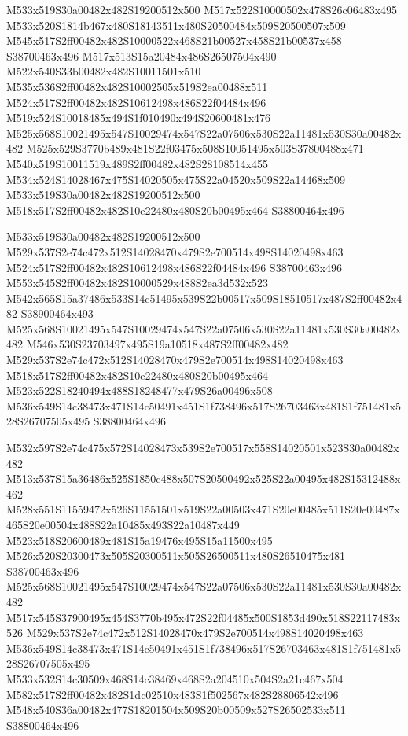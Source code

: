 \documentclass{article}
\begin{document}
\begin{multicols}{2}
M533x519S30a00482x482S19200512x500 M517x522S10000502x478S26c06483x495 M533x520S1814b467x480S18143511x480S20500484x509S20500507x509 M545x517S2ff00482x482S10000522x468S21b00527x458S21b00537x458 S38700463x496 M517x513S15a20484x486S26507504x490 M522x540S33b00482x482S10011501x510 M535x536S2ff00482x482S10002505x519S2ea00488x511 M524x517S2ff00482x482S10612498x486S22f04484x496 M519x524S10018485x494S1f010490x494S20600481x476 M525x568S10021495x547S10029474x547S22a07506x530S22a11481x530S30a00482x482 M525x529S3770b489x481S22f03475x508S10051495x503S37800488x471 M540x519S10011519x489S2ff00482x482S28108514x455 M534x524S14028467x475S14020505x475S22a04520x509S22a14468x509 M533x519S30a00482x482S19200512x500 M518x517S2ff00482x482S10e22480x480S20b00495x464 S38800464x496

M533x519S30a00482x482S19200512x500 M529x537S2e74c472x512S14028470x479S2e700514x498S14020498x463 M524x517S2ff00482x482S10612498x486S22f04484x496 S38700463x496 M553x545S2ff00482x482S10000529x488S2ea3d532x523 M542x565S15a37486x533S14c51495x539S22b00517x509S18510517x487S2ff00482x482 S38900464x493 M525x568S10021495x547S10029474x547S22a07506x530S22a11481x530S30a00482x482 M546x530S23703497x495S19a10518x487S2ff00482x482 M529x537S2e74c472x512S14028470x479S2e700514x498S14020498x463 M518x517S2ff00482x482S10e22480x480S20b00495x464 M523x522S18240494x488S18248477x479S26a00496x508 M536x549S14c38473x471S14c50491x451S1f738496x517S26703463x481S1f751481x528S26707505x495 S38800464x496

M532x597S2e74c475x572S14028473x539S2e700517x558S14020501x523S30a00482x482 M513x537S15a36486x525S1850c488x507S20500492x525S22a00495x482S15312488x462 M528x551S11559472x526S11551501x519S22a00503x471S20e00485x511S20e00487x465S20e00504x488S22a10485x493S22a10487x449 M523x518S20600489x481S15a19476x495S15a11500x495 M526x520S20300473x505S20300511x505S26500511x480S26510475x481 S38700463x496 M525x568S10021495x547S10029474x547S22a07506x530S22a11481x530S30a00482x482 M517x545S37900495x454S3770b495x472S22f04485x500S1853d490x518S22117483x526 M529x537S2e74c472x512S14028470x479S2e700514x498S14020498x463 M536x549S14c38473x471S14c50491x451S1f738496x517S26703463x481S1f751481x528S26707505x495 M533x532S14c30509x468S14c38469x468S2a204510x504S2a21c467x504 M582x517S2ff00482x482S1dc02510x483S1f502567x482S28806542x496 M548x540S36a00482x477S18201504x509S20b00509x527S26502533x511 S38800464x496


\end{multicols}
\end{document}
